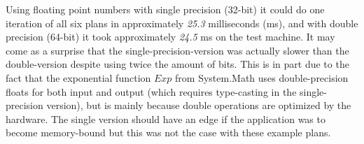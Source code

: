 Using floating point numbers with single precision (32-bit) it could do one iteration of all six plans in approximately \emph{25.3} milliseconds (ms), and with double precision (64-bit) it took approximately \emph{24.5} ms on the test machine.
It may come as a surprise that the single-precision-version was actually slower than the double-version despite using twice the amount of bits.
This is in part due to the fact that the exponential function $Exp$ from System.Math uses double-precision floats for both input and output (which requires type-casting in the single-precision version), but is mainly because double operations are optimized by the hardware\cite{northrup2008mcts}.
The single version should have an edge if the application was to become memory-bound but this was not the case with these example plans.